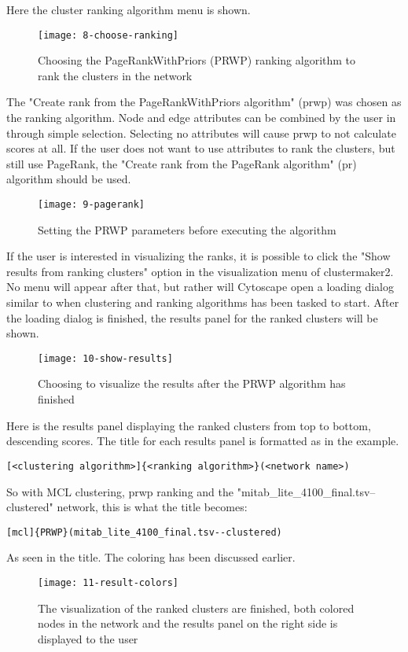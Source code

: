 Here the cluster ranking algorithm menu is shown.
\begin{figure}[H]
    \texttt{[image: 8-choose-ranking]}
    \caption{Choosing the PageRankWithPriors (PRWP) ranking algorithm to rank
    the clusters in the network}
    \label{fig:choose-ranking}
\end{figure}

The "Create rank from the PageRankWithPriors algorithm" (\gls{prwp}) was chosen
as the ranking algorithm. Node and edge attributes can be combined by the user
in through simple selection. Selecting no attributes will cause \gls{prwp} to
not calculate scores at all. If the user does not want to use attributes to rank
the clusters, but still use PageRank, the "Create rank from the PageRank
algorithm" (\gls{pr}) algorithm should be used.
\begin{figure}[H]
    \texttt{[image: 9-pagerank]}
    \caption{Setting the PRWP parameters before executing the algorithm}
    \label{fig:pagerank}
\end{figure}

If the user is interested in visualizing the ranks, it is possible to click the
"Show results from ranking clusters" option in the visualization menu of
clustermaker2. No menu will appear after that, but rather will Cytoscape open
a loading dialog similar to when clustering and ranking algorithms has been
tasked to start. After the loading dialog is finished, the results panel for the
ranked clusters will be shown.
\begin{figure}[H]
    \texttt{[image: 10-show-results]}
    \caption{Choosing to visualize the results after the PRWP algorithm has
    finished}
    \label{fig:show-results}
\end{figure}

Here is the results panel displaying the ranked clusters from top to bottom,
descending scores. The title for each results panel is formatted as in the
example.
\begin{Verbatim}[fontsize=\scriptsize]
[<clustering algorithm>]{<ranking algorithm>}(<network name>)
\end{Verbatim}
So with MCL clustering, \gls{prwp} ranking and the
"mitab\_lite\_4100\_final.tsv--clustered" network, this is what the title
becomes:
\begin{Verbatim}[fontsize=\scriptsize]
[mcl]{PRWP}(mitab_lite_4100_final.tsv--clustered)
\end{Verbatim}
As seen in the title. The coloring has been discussed earlier.
\begin{figure}[H]
    \texttt{[image: 11-result-colors]}
    \caption{The visualization of the ranked clusters are finished, both colored
        nodes in the network and the results panel on the right side is
    displayed to the user}
    \label{fig:result-colors}
\end{figure}

